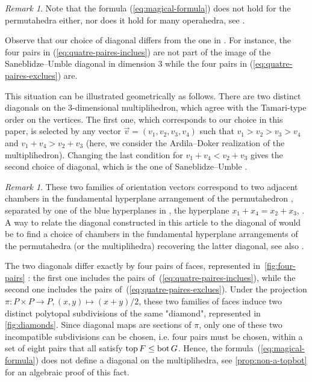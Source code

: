 \documentclass[twoside, 12pt]{amsart}
\theoremstyle{remark}
\newtheorem{remark}[definition]{\sc Remark}
\begin{document}
\begin{remark}
Note that the formula (\ref{eq:magical-formula}) does not hold for the permutahedra either, nor does it hold for many operahedra, see \cite[Section 3.2]{LA21}.
\end{remark}


Observe that our choice of diagonal differs from the one in \cite[Section 5]{SaneblidzeUmble04}. 
For instance, the four pairs in (\ref{eq:quatre-paires-inclues}) are not part of the image of the Saneblidze--Umble diagonal in dimension $3$ while the four pairs in (\ref{eq:quatre-paires-exclues}) are. 

This situation can be illustrated geometrically as follows. 
There are two distinct diagonals on the 3-dimensional multiplihedron, which agree with the Tamari-type order on the vertices. 
The first one, which corresponds to our choice in this paper, is selected by any vector $\vec v=(v_1,v_2,v_3,v_4)$ such that $v_1>v_2>v_3>v_4$ and $v_1 + v_4 > v_2+v_3$ (here, we consider the Ardila--Doker realization of the multiplihedron).
Changing the last condition for $v_1 + v_4 < v_2+v_3$ gives the second choice of diagonal, which is the one of Saneblidze--Umble \cite[Section 5]{SaneblidzeUmble04}. 

\begin{remark}
  These two families of orientation vectors correspond to two adjacent chambers in the fundamental hyperplane arrangement of the permutahedron \cite[Theorem 3.6]{LA21}, separated by one of the blue hyperplanes in \cite[Figure 12]{LA21}, the hyperplane $x_1+x_4=x_2+x_3$, .
  A way to relate the diagonal constructed in this article to the diagonal of \cite[Section 5]{SaneblidzeUmble04} would be to find a choice of chambers in the fundamental hyperplane arrangements of the permutahedra (or the multiplihedra) recovering the latter diagonal, see also \cite[Remark~3.18]{LA21}.
\end{remark}

The two diagonals differ exactly by four pairs of faces, represented in~\cref{fig:four-pairs} : the first one includes the pairs of~(\ref{eq:quatre-paires-inclues}), while the second one includes the pairs of~(\ref{eq:quatre-paires-exclues}).
Under the projection $\pi : P\times P \to P, (x,y) \mapsto (x+y)/2$, these two families of faces induce two distinct polytopal subdivisions of the same "diamond", represented in \cref{fig:diamonds}. 
Since diagonal maps are sections of $\pi$, only one of these two incompatible subdivisions can be chosen, i.e. four pairs must be chosen, within a set of eight pairs that all satisfy $\operatorname{top} F \leq \operatorname{bot} G$. 
Hence, the formula~(\ref{eq:magical-formula}) does not define a diagonal on the multiplihedra, see \cref{prop:non-a-topbot} for an algebraic proof of this fact.
\end{document}
